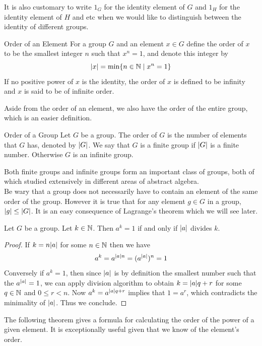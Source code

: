 \documentclass[a4paper]{article}
\begin{document}
It is also customary to write $1_G$ for the identity element of $G$ and $1_H$ for the identity element of $H$ and etc when we would like to distinguish between the identity of different groups. 

\begin{defn}{Order of an Element}{} For a group $G$ and an element $x\in G$ define the order of $x$ to be the smallest integer $n$ such that $x^n=1$, and denote this integer by $$\abs{x}=\min\{n\in\mathbb{N}\;|\;x^n=1\}$$ If no positive power of $x$ is the identity, the order of $x$ is defined to be infinity and $x$ is said to be of infinite order. 
\end{defn}

Aside from the order of an element, we also have the order of the entire group, which is an easier definition. 

\begin{defn}{Order of a Group}{} Let $G$ be a group. The order of $G$ is the number of elements that $G$ has, denoted by $\abs{G}$. We say that $G$ is a finite group if $\abs{G}$ is a finite number. Otherwise $G$ is an infinite group. 
\end{defn}

Both finite groups and infinite groups form an important class of groups, both of which studied extensively in different areas of abstract algebra. \\

Be wary that a group does not necessarily have to contain an element of the same order of the group. However it is true that for any element $g\in G$ in a group, $\abs{g}\leq\abs{G}$. It is an easy consequence of Lagrange's theorem which we will see later. 

\begin{lmm}{}{} Let $G$ be a group. Let $k\in\mathbb{N}$. Then $a^k=1$ if and only if $\abs{a}$ divides $k$. 
\begin{proof}
If $k=n\abs{a}$ for some $n\in\mathbb{N}$ then we have $$a^k=a^{\abs{a}n}=(a^\abs{a})^n=1$$ Conversely if $a^k=1$, then since $\abs{a}$ is by definition the smallest number such that the $a^\abs{a}=1$, we can apply division algorithm to obtain $k=\abs{a}q+r$ for some $q\in\mathbb{N}$ and $0\leq r<n$. Now $a^{k}=a^{\abs{a}q+r}$ implies that $1=a^r$, which contradicts the minimality of $\abs{a}$. Thus we conclude. 
\end{proof}
\end{lmm}

The following theorem gives a formula for calculating the order of the power of a given element. It is exceptionally useful given that we know of the element's order. 
\end{document}
